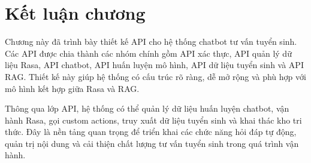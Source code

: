 \section{Kết luận chương}

Chương này đã trình bày thiết kế API cho hệ thống chatbot tư vấn tuyển sinh. Các API được chia thành các nhóm chính gồm API xác thực, API quản lý dữ liệu Rasa, API chatbot, API huấn luyện mô hình, API dữ liệu tuyển sinh và API RAG. Thiết kế này giúp hệ thống có cấu trúc rõ ràng, dễ mở rộng và phù hợp với mô hình kết hợp giữa Rasa và RAG.

Thông qua lớp API, hệ thống có thể quản lý dữ liệu huấn luyện chatbot, vận hành Rasa, gọi custom actions, truy xuất dữ liệu tuyển sinh và khai thác kho tri thức. Đây là nền tảng quan trọng để triển khai các chức năng hỏi đáp tự động, quản trị nội dung và cải thiện chất lượng tư vấn tuyển sinh trong quá trình vận hành.
